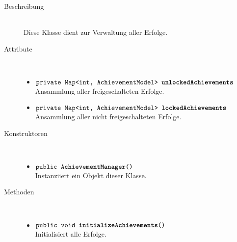 \begin{description}
\item[Beschreibung] \hfill \\ Diese Klasse dient zur Verwaltung aller Erfolge.
\item[Attribute] \hfill \\
	\vspace{-.8cm}
	\begin{itemize}
		\item $\texttt{private Map<int, AchievementModel> \textbf{unlockedAchievements}}$ \\ Ansammlung aller freigeschalteten Erfolge.
		\item $\texttt{private Map<int, AchievementModel> \textbf{lockedAchievements}}$ \\ Ansammlung aller nicht freigeschalteten Erfolge.
	\end{itemize}
	
\item[Konstruktoren] \hfill \\
	\vspace{-.8cm}
	\begin{itemize}
		\item $\texttt{public \textbf{AchievementManager}()}$ \\ Instanziiert ein Objekt dieser Klasse.
	\end{itemize}
	
\item[Methoden] \hfill \\
	\vspace{-.8cm}
	\begin{itemize}
	
		\item $\texttt{public void \textbf{initializeAchievements}()}$ \\ Initialisiert alle Erfolge.
	

\end{itemize}
\end{description}
